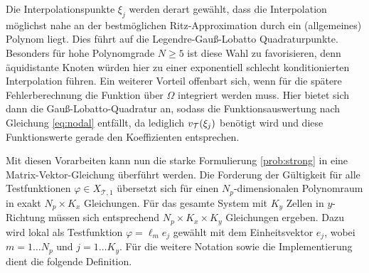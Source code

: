 Die Interpolationspunkte $\xi_j$ werden derart gewählt, dass die Interpolation möglichst nahe an der bestmöglichen Ritz-Approximation durch ein (allgemeines) Polynom liegt. Dies führt auf die Legendre-Gauß-Lobatto Quadraturpunkte. Besonders für hohe Polynomgrade $N\geq 5$ ist diese Wahl zu favorisieren, denn äquidistante Knoten würden hier zu einer exponentiell schlecht konditionierten Interpolation führen. Ein weiterer Vorteil offenbart sich, wenn für die spätere Fehlerberechnung die Funktion über $\Omega$ integriert werden muss. Hier bietet sich dann die Gauß-Lobatto-Quadratur an, sodass die Funktionsauswertung nach Gleichung \eqref{eq:nodal} entfällt, da lediglich $v_{\mathcal{T}}(\xi_j)$ benötigt wird und diese Funktionswerte gerade den Koeffizienten entsprechen.

Mit diesen Vorarbeiten kann nun die starke Formulierung \ref{prob:strong} in eine Matrix-Vektor-Gleichung überführt werden. Die Forderung der Gültigkeit für alle Testfunktionen $\varphi\in X_{\mathcal{T},1}$ übersetzt sich für einen $N_p$-dimensionalen Polynomraum in exakt $N_p \times K_x$ Gleichungen. Für das gesamte System mit $K_y$ Zellen in $y$-Richtung müssen sich entsprechend $N_p \times K_x \times K_y$ Gleichungen ergeben. Dazu wird lokal als Testfunktion $\varphi = \ell_m e_j$ gewählt mit dem Einheitsvektor $e_j$, wobei $m=1\dots N_p$ und $j=1\dots K_y$. Für die weitere Notation sowie die Implementierung dient die folgende Definition.
